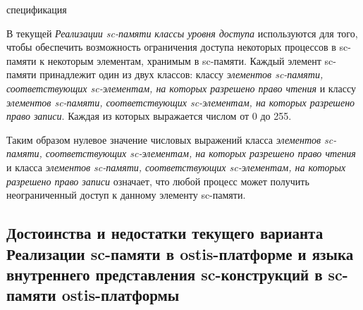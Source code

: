 \begin{SCn}
\begin{scnrelfromset}{спецификация}
\end{scnrelfromset}
\end{SCn}

В текущей \textit{Реализации sc-памяти} \textit{классы уровня доступа} используются для того, чтобы обеспечить возможность ограничения доступа некоторых процессов в sc-памяти к некоторым элементам, хранимым в sc-памяти. Каждый элемент sc-памяти принадлежит один из двух классов: классу \textit{элементов sc-памяти, соответствующих sc-элементам, на которых разрешено право чтения} и классу \textit{элементов sc-памяти, соответствующих sc-элементам, на которых разрешено право записи}. Каждая из которых выражается числом от 0 до 255.

Таким образом нулевое значение числовых выражений класса \textit{элементов sc-памяти, соответствующих sc-элементам, на которых разрешено право чтения} и класса \textit{элементов sc-памяти, соответствующих sc-элементам, на которых разрешено право записи} означает, что любой процесс может получить неограниченный доступ к данному элементу sc-памяти.

\subsection{Достоинства и недостатки текущего варианта Реализации sc-памяти в ostis-платформе и языка внутреннего представления sc-конструкций в sc-памяти ostis-платформы}
\label{sec_soft_platform_scin_code_problems}

